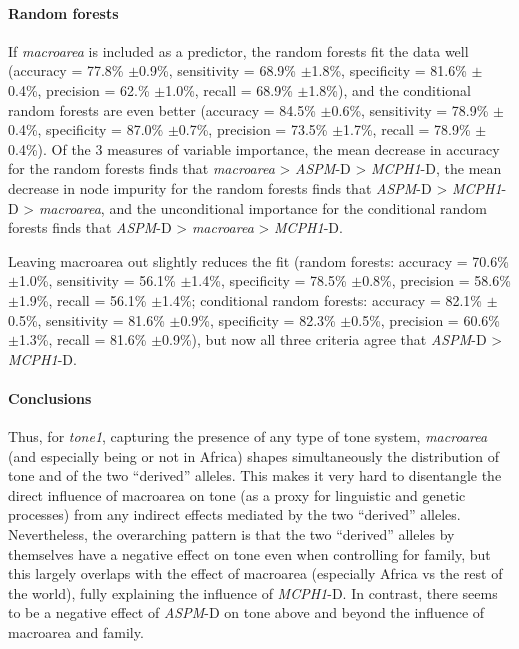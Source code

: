 \documentclass[twoside,onecolumn]{article}
\begin{document}
\paragraph{Random forests}

If \textit{macroarea} is included as a predictor, the random forests fit the data well (accuracy = 77.8\% $\pm$0.9\%, sensitivity = 68.9\% $\pm$1.8\%, specificity = 81.6\% $\pm$0.4\%, precision = 62.\% $\pm$1.0\%, recall = 68.9\% $\pm$1.8\%), and the conditional random forests are even better (accuracy = 84.5\% $\pm$0.6\%, sensitivity = 78.9\% $\pm$0.4\%, specificity = 87.0\% $\pm$0.7\%, precision = 73.5\% $\pm$1.7\%, recall = 78.9\% $\pm$0.4\%).
Of the 3 measures of variable importance, the mean decrease in accuracy for the random forests finds that \textit{macroarea} > \textit{ASPM}-D > \textit{MCPH1}-D, the mean decrease in node impurity for the random forests finds that \textit{ASPM}-D > \textit{MCPH1}-D > \textit{macroarea}, and the unconditional importance for the conditional random forests finds that \textit{ASPM}-D > \textit{macroarea} > \textit{MCPH1}-D.

Leaving macroarea out slightly reduces the fit (random forests: accuracy = 70.6\% $\pm$1.0\%, sensitivity = 56.1\% $\pm$1.4\%, specificity = 78.5\% $\pm$0.8\%, precision = 58.6\% $\pm$1.9\%, recall = 56.1\% $\pm$1.4\%; conditional random forests: accuracy = 82.1\% $\pm$0.5\%, sensitivity = 81.6\% $\pm$0.9\%, specificity = 82.3\% $\pm$0.5\%, precision = 60.6\% $\pm$1.3\%, recall = 81.6\% $\pm$0.9\%), but now all three criteria agree that \textit{ASPM}-D > \textit{MCPH1}-D.


\paragraph{Conclusions}

Thus, for \textit{tone1}, capturing the presence of any type of tone system, \textit{macroarea} (and especially being or not in Africa) shapes simultaneously the distribution of tone and of the two ``derived'' alleles.
This makes it very hard to disentangle the direct influence of macroarea on tone (as a proxy for linguistic and genetic processes) from any indirect effects mediated by the two ``derived'' alleles.
Nevertheless, the overarching pattern is that the two ``derived'' alleles by themselves have a negative effect on tone even when controlling for family, but this largely overlaps with the effect of macroarea (especially Africa vs the rest of the world), fully explaining the influence of \textit{MCPH1}-D.
In contrast, there seems to be a negative effect of \textit{ASPM}-D on tone above and beyond the influence of macroarea and family.
\end{document}
